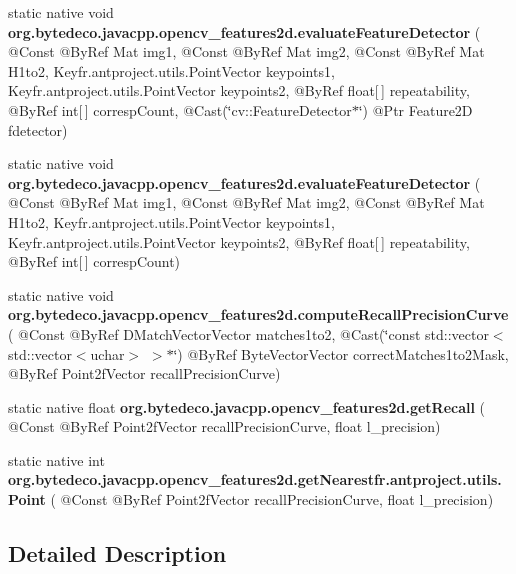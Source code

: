 \begin{DoxyCompactItemize}
static native void {\bfseries org.\+bytedeco.\+javacpp.\+opencv\+\_\+features2d.\+evaluate\+Feature\+Detector} ( @Const @By\+Ref Mat img1, @Const @By\+Ref Mat img2, @Const @By\+Ref Mat H1to2, Key\+fr.antproject.utils.Point\+Vector keypoints1, Key\+fr.antproject.utils.Point\+Vector keypoints2, @By\+Ref float\mbox{[}$\,$\mbox{]} repeatability, @By\+Ref int\mbox{[}$\,$\mbox{]} corresp\+Count, @Cast(\char`\"{}cv\+::\+Feature\+Detector$\ast$\char`\"{}) @Ptr Feature2D fdetector)
\item 
\mbox{\label{group__features2d_gac9f6b29e290c3332acc345c8a01c87ce}} 
static native void {\bfseries org.\+bytedeco.\+javacpp.\+opencv\+\_\+features2d.\+evaluate\+Feature\+Detector} ( @Const @By\+Ref Mat img1, @Const @By\+Ref Mat img2, @Const @By\+Ref Mat H1to2, Key\+fr.antproject.utils.Point\+Vector keypoints1, Key\+fr.antproject.utils.Point\+Vector keypoints2, @By\+Ref float\mbox{[}$\,$\mbox{]} repeatability, @By\+Ref int\mbox{[}$\,$\mbox{]} corresp\+Count)
\item 
\mbox{\label{group__features2d_gab9c229306c2d055cfbe158fee3aa99ba}} 
static native void {\bfseries org.\+bytedeco.\+javacpp.\+opencv\+\_\+features2d.\+compute\+Recall\+Precision\+Curve} ( @Const @By\+Ref D\+Match\+Vector\+Vector matches1to2, @Cast(\char`\"{}const std\+::vector$<$std\+::vector$<$uchar$>$ $>$$\ast$\char`\"{}) @By\+Ref Byte\+Vector\+Vector correct\+Matches1to2\+Mask, @By\+Ref Point2f\+Vector recall\+Precision\+Curve)
\item 
\mbox{\label{group__features2d_gafa560a4da7ac6bd13b1b1748fb8f36cf}} 
static native float {\bfseries org.\+bytedeco.\+javacpp.\+opencv\+\_\+features2d.\+get\+Recall} ( @Const @By\+Ref Point2f\+Vector recall\+Precision\+Curve, float l\+\_\+precision)
\item 
\mbox{\label{group__features2d_gac14421ece616aca60beb57e99208b0df}} 
static native int {\bfseries org.\+bytedeco.\+javacpp.\+opencv\+\_\+features2d.\+get\+Nearest\+fr.antproject.utils.Point} ( @Const @By\+Ref Point2f\+Vector recall\+Precision\+Curve, float l\+\_\+precision)
\end{DoxyCompactItemize}


\subsection{Detailed Description}



